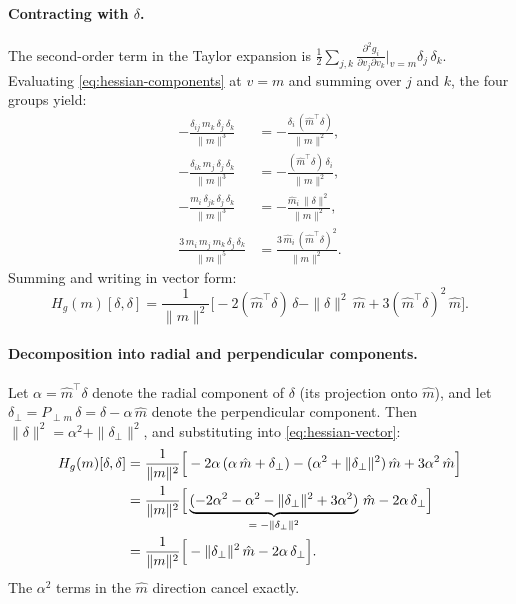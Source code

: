 \paragraph{Contracting with $\delta$.}

The second-order term in the Taylor expansion is
$\frac{1}{2}\sum_{j,k} \frac{\partial^2 g_i}{\partial v_j \partial v_k}\big|_{v=m} \delta_j\,\delta_k$.
Evaluating \eqref{eq:hessian-components} at $v = m$ and summing over
$j$ and $k$, the four groups yield:
%
\begin{align}
  -\frac{\delta_{ij}\,m_k\,\delta_j\,\delta_k}{\|m\|^3}
  &= -\frac{\delta_i\,(\hat{m}^\top\delta)}{\|m\|^2},
  \label{eq:hess-term1}\\[4pt]
  -\frac{\delta_{ik}\,m_j\,\delta_j\,\delta_k}{\|m\|^3}
  &= -\frac{(\hat{m}^\top\delta)\,\delta_i}{\|m\|^2},
  \label{eq:hess-term2}\\[4pt]
  -\frac{m_i\,\delta_{jk}\,\delta_j\,\delta_k}{\|m\|^3}
  &= -\frac{\hat{m}_i\,\|\delta\|^2}{\|m\|^2},
  \label{eq:hess-term3}\\[4pt]
  \frac{3\,m_i\,m_j\,m_k\,\delta_j\,\delta_k}{\|m\|^5}
  &= \frac{3\,\hat{m}_i\,(\hat{m}^\top\delta)^2}{\|m\|^2}.
  \label{eq:hess-term4}
\end{align}
%
Summing and writing in vector form:
%
\begin{equation}
  H_g(m)[\delta,\delta]
  = \frac{1}{\|m\|^2}\Big[
    -2(\hat{m}^\top\delta)\,\delta
    - \|\delta\|^2\,\hat{m}
    + 3(\hat{m}^\top\delta)^2\,\hat{m}
  \Big].
  \label{eq:hessian-vector}
\end{equation}

\paragraph{Decomposition into radial and perpendicular components.}

Let $\alpha = \hat{m}^\top\delta$ denote the radial component of $\delta$
(its projection onto $\hat{m}$), and let
$\delta_\perp = P_{\perp m}\,\delta = \delta - \alpha\,\hat{m}$
denote the perpendicular component.
Then $\|\delta\|^2 = \alpha^2 + \|\delta_\perp\|^2$, and substituting
into \eqref{eq:hessian-vector}:
%
\begin{align}
  H_g(m)[\delta,\delta]
  &= \frac{1}{\|m\|^2}\Big[
    -2\alpha\,(\alpha\,\hat{m} + \delta_\perp)
    - (\alpha^2 + \|\delta_\perp\|^2)\,\hat{m}
    + 3\alpha^2\,\hat{m}
  \Big]
  \notag\\
  &= \frac{1}{\|m\|^2}\Big[
    \underbrace{(-2\alpha^2 - \alpha^2 - \|\delta_\perp\|^2 + 3\alpha^2)}_{=\;-\|\delta_\perp\|^2}\,\hat{m}
    - 2\alpha\,\delta_\perp
  \Big]
  \notag\\
  &= \frac{1}{\|m\|^2}\Big[
    -\|\delta_\perp\|^2\,\hat{m}
    - 2\alpha\,\delta_\perp
  \Big].
  \label{eq:hessian-simplified}
\end{align}
%
The $\alpha^2$ terms in the $\hat{m}$ direction cancel exactly.

